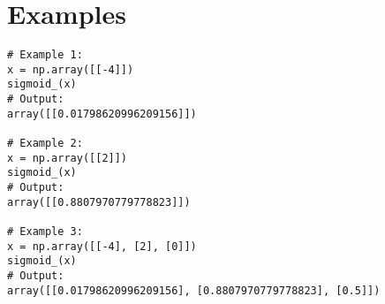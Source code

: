 \section*{Examples}

\begin{verbatim}
# Example 1:
x = np.array([[-4]])
sigmoid_(x)
# Output:
array([[0.01798620996209156]])

# Example 2:
x = np.array([[2]])
sigmoid_(x)
# Output:
array([[0.8807970779778823]])

# Example 3:
x = np.array([[-4], [2], [0]])
sigmoid_(x)
# Output:
array([[0.01798620996209156], [0.8807970779778823], [0.5]])
\end{verbatim}


